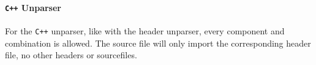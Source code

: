 \documentclass{report}
\begin{document}
\paragraph{\texttt{C++} Unparser}
For the \texttt{C++} unparser, like with the header unparser, every component and combination is allowed. The source file will only import the corresponding header file, no other headers or sourcefiles.


\newpage
\pagestyle{empty}


\end{document}

